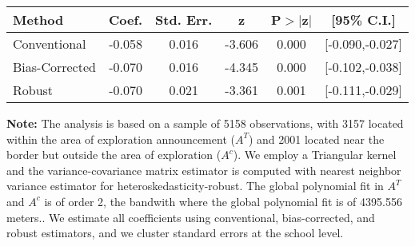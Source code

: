 \begin{table}[htbp]\centering
 \footnotesize 
\begin{tabular}{lccccc}
\hline\hline
Method & Coef. & Std. Err. & z & P$>|$z$|$ & [95\% C.I.] \\ 
\hline \hline  
Conventional & -0.058 & 0.016 & -3.606 & 0.000 & [-0.090,-0.027] \\ 
 Bias-Corrected & -0.070 & 0.016 & -4.345 & 0.000 & [-0.102,-0.038] \\ 
Robust & -0.070 & 0.021 & -3.361 & 0.001 & [-0.111,-0.029] \\ 
  \hline\hline
\end{tabular}
\label{table:rd}
\begin{tablenotes} 
  \justifying \tiny \textbf{Note: }    
   The analysis is based on a sample of 5158 observations, with 3157 located within the area of exploration announcement ($A^{T}$) and 2001 located near the border but outside the area of exploration  ($A^{c}$). 
           We employ a Triangular kernel and the variance-covariance matrix estimator is computed with nearest neighbor variance estimator for heteroskedasticity-robust. The global polynomial fit in  $A^{T}$ and $A^{c}$ is of order 2, the bandwith where the global polynomial fit is of 4395.556 meters.. We estimate all coefficients using conventional, bias-corrected, and robust estimators, and we cluster standard errors at the school level. \end{tablenotes} 
 \end{table} 
